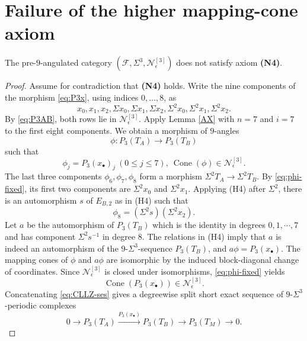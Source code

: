 \documentclass[12pt, twoside]{article}
\numberwithin{equation}{section}
\begin{document}
\section{Failure of the higher mapping-cone axiom}

\begin{theorem}\label{th1}\rm
The pre-$9$-angulated category $(\mathcal F,\Sigma^3,\mathcal N_\epsilon^{[3]})$ does not satisfy axiom \textbf{(N4)}.
\end{theorem}

\begin{proof}
Assume for contradiction that \textbf{(N4)} holds. Write the nine components of the morphism \eqref{eq:P3x}, using indices $0,\ldots,8$, as
\[
x_0,x_1,x_2,\Sigma x_0,\Sigma x_1,\Sigma x_2,
\Sigma^2x_0,\Sigma^2x_1,\Sigma^2x_2.
\]
By \eqref{eq:P3AB}, both rows lie in $\mathcal N_\epsilon^{[3]}$. Apply Lemma \ref{AX} with $n=7$ and $i=7$ to the first eight components. We obtain a morphism of $9$-angles
\[
\phi\colon P_3(T_A)\longrightarrow P_3(T_B)
\]
such that
\begin{equation}\label{eq:phi-fixed}
\phi_j=P_3(x_\bullet)_j~(0\leq j\leq7),
~
\operatorname{Cone}(\phi)\in\mathcal N_\epsilon^{[3]}.
\end{equation}
The last three components $\phi_6,\phi_7,\phi_8$ form a morphism
$\Sigma^2T_A\to\Sigma^2T_B$. By \eqref{eq:phi-fixed}, its first two components are $\Sigma^2x_0$ and $\Sigma^2x_1$. Applying (H4) after $\Sigma^2$, there is an automorphism $s$ of $E_{B,2}$ as in (H4) such that
\[
\phi_8=(\Sigma^2s)(\Sigma^2x_2).
\]
Let $a$ be the automorphism of $P_3(T_B)$ which is the identity in degrees $0,1,\cdots,7$ and has component $\Sigma^2s^{-1}$ in degree $8$. The relations in (H4) imply that $a$ is indeed an automorphism of the $9$-$\Sigma^3$-sequence $P_3(T_B)$, and
$
a\phi=P_3(x_\bullet).
$
The mapping cones of $\phi$ and $a\phi$ are isomorphic by the induced block-diagonal change of coordinates. Since $\mathcal N_\epsilon^{[3]}$ is closed under isomorphisms, \eqref{eq:phi-fixed} yields
\begin{equation}\label{eq:cone-standard-in-N}
\operatorname{Cone}(P_3(x_\bullet))\in\mathcal N_\epsilon^{[3]}.
\end{equation}
Concatenating \eqref{eq:CLLZ-ses} gives a degreewise split short exact sequence of $9$-$\Sigma^3$-periodic complexes
\begin{equation*}
0\longrightarrow P_3(T_A)\xrightarrow{P_3(x_\bullet)}P_3(T_B)
\longrightarrow P_3(T_M)\longrightarrow0.
\end{equation*}

\end{proof}
\end{document}
